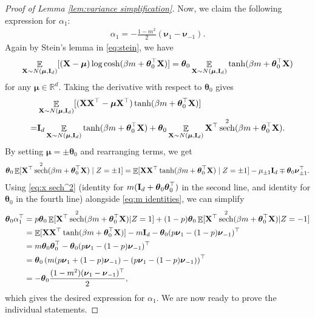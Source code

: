 \documentclass[preprint,reqno]{imsart}
\newcommand{\ttheta}{\boldsymbol{\theta}}
\newcommand{\I}{\mathbf{I}_{\mathnormal{d}}}
\DeclareMathOperator{\sech}{sech}
\DeclareMathOperator{\EE}{\mathbb{E}}
\newcommand{\X}{\mathbf{X}}
\begin{document}
\begin{appendix}
\begin{proof}[Proof of Lemma \ref{lem:variance simplification}]
Now, we claim the following expression for $\alpha_1$:
\begin{align}\label{eq:alpha 1}
    \alpha_1 = -\frac{1-m^2}{2} (\boldsymbol{\nu}_1 - \boldsymbol{\nu}_{-1}).
\end{align}
Again by Stein's lemma in \eqref{eq:stein}, we have
$$\EE_{\X \sim N(\boldsymbol{\mu},\I)} [(\X-\boldsymbol{\mu}) \log \cosh(\beta m + \ttheta_0^\top \X)] = \ttheta_0 \EE_{\X \sim N(\boldsymbol{\mu},\I)} \tanh(\beta m + \ttheta_0^\top \X)$$
for any $\boldsymbol{\mu} \in \mathbb{R}^d$.
Taking the derivative with respect to $\ttheta_0$ gives
\begin{align*}
    &\EE_{\X \sim N(\boldsymbol{\mu},\I)} [(\X \X^\top-\boldsymbol{\mu} \X^\top) \tanh (\beta m + \ttheta_0^\top \X)] \\
    =& \I \EE_{\X \sim N(\boldsymbol{\mu},\I)} \tanh(\beta m + \ttheta_0^\top \X) + \ttheta_0 \EE_{\X \sim N(\boldsymbol{\mu},\I)} \X^{\top} \sech^2(\beta m + \ttheta_0^\top \X).
\end{align*}
By setting $\boldsymbol{\mu} = \pm \ttheta_0$ and rearranging terms, we get
\begin{align}\label{eq:x sech^2}
    \ttheta_0 \EE[ \X^{\top} \sech^2(\beta m + \ttheta_0^\top \X)\mid Z = \pm 1] = \EE[ \X \X^{\top} \tanh(\beta m + \ttheta_0^{\top} \X) \mid Z = \pm 1] - \mu_{\pm 1} \I \mp \ttheta_0 \boldsymbol{\nu}_{\pm 1}^{\top}.
\end{align}
Using \eqref{eq:x sech^2} (identity for $m(\I+\ttheta_0 \ttheta_0^\top)$ in the second line, and identity for $\ttheta_0$ in the fourth line) alongside \eqref{eq:m identities}, we can simplify
\begin{align*}
    \ttheta_0 \alpha_1^{\top} &= p \ttheta_0\EE[\X^{\top} \sech^2(\beta m + \ttheta_0^\top \X) | Z = 1 ] + (1-p) \ttheta_0 \EE[\X^{\top} \sech^2(\beta m + \ttheta_0^\top \X) | Z = -1 ] \\
    &= {\EE [\X \X^{\top} \tanh(\beta m + \ttheta_0^\top \X)] - m \I} - \ttheta_0 (p \boldsymbol{\nu}_1 - (1-p) \boldsymbol{\nu}_{-1})^{\top} \\
    &= m \ttheta_0 \ttheta_0^\top - \ttheta_0 (p \boldsymbol{\nu}_1 - (1-p) \boldsymbol{\nu}_{-1})^\top \\
    &= \ttheta_0 \left( m (p \boldsymbol{\nu}_1 + (1-p) \boldsymbol{\nu}_{-1}) - (p \boldsymbol{\nu}_1 - (1-p) \boldsymbol{\nu}_{-1}) \right)^{\top} \\
    &= - \ttheta_0 \frac{(1-m^2) (\boldsymbol{\nu}_1 - \boldsymbol{\nu}_{-1})^{\top}}{2},
\end{align*}
which gives the desired expression for $\alpha_1$.
We are now ready to prove the individual statements.


\end{proof}
\end{appendix}
\end{document}
